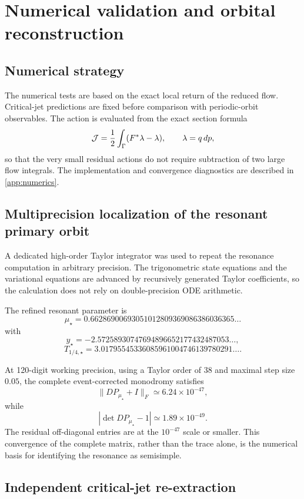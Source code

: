 \section{Numerical validation and orbital reconstruction}
\label{sec:numerics}

\subsection{Numerical strategy}

The numerical tests are based on the exact local return of the reduced flow.  Critical-jet predictions are fixed before comparison with periodic-orbit observables.  The action is evaluated from the exact section formula
\[
\mathcal{J}=\frac12\int_\Gamma(F^*\lambda-\lambda),
\qquad \lambda=q\,dp,
\]
so that the very small residual actions do not require subtraction of two large flow integrals.  The implementation and convergence diagnostics are described in \cref{app:numerics}.

\subsection{Multiprecision localization of the resonant primary orbit}

A dedicated high-order Taylor integrator was used to repeat the resonance computation in arbitrary precision.  The trigonometric state equations and the variational equations are advanced by recursively generated Taylor coefficients, so the calculation does not rely on double-precision ODE arithmetic.

The refined resonant parameter is
\begin{equation}
\boxed{
\mu_\star
=0.66286900693051012809369086386036365\ldots
}
\label{eq:mustar-mp}
\end{equation}
with
\[
y_\star
=-2.57258930747694896652177432487053\ldots,
\]
\[
T_{1/4,\star}
=3.01795545336085961004746139780291\ldots.
\]

At 120-digit working precision, using a Taylor order of 38 and maximal step size $0.05$, the complete event-corrected monodromy satisfies
\[
\boxed{
\|DP_{\mu_\star}+I\|_F
\simeq 6.24\times10^{-47},
}
\]
while
\[
|\det DP_{\mu_\star}-1|
\simeq1.89\times10^{-49}.
\]
The residual off-diagonal entries are at the $10^{-47}$ scale or smaller.  This convergence of the complete matrix, rather than the trace alone, is the numerical basis for identifying the resonance as semisimple.

\subsection{Independent critical-jet re-extraction}


